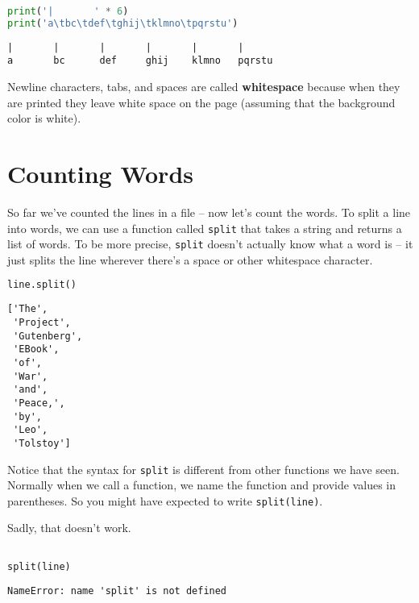 \begin{lstlisting}[language=Python,style=source]
print('|       ' * 6)
print('a\tbc\tdef\tghij\tklmno\tpqrstu')
\end{lstlisting}

\begin{lstlisting}[style=output]
|       |       |       |       |       |
a       bc      def     ghij    klmno   pqrstu
\end{lstlisting}

Newline characters, tabs, and spaces are called \textbf{whitespace}
because when they are printed they leave white space on the page
(assuming that the background color is white).

\section{Counting Words}\label{counting-words}

So far we've counted the lines in a file -- now let's count the words.
To split a line into words, we can use a function called
\passthrough{\lstinline!split!} that takes a string and returns a list
of words. To be more precise, \passthrough{\lstinline!split!} doesn't
actually know what a word is -- it just splits the line wherever there's
a space or other whitespace character.

\begin{lstlisting}[language=Python,style=source]
line.split()
\end{lstlisting}

\begin{lstlisting}[style=output]
['The',
 'Project',
 'Gutenberg',
 'EBook',
 'of',
 'War',
 'and',
 'Peace,',
 'by',
 'Leo',
 'Tolstoy']
\end{lstlisting}

Notice that the syntax for \passthrough{\lstinline!split!} is different
from other functions we have seen. Normally when we call a function, we
name the function and provide values in parentheses. So you might have
expected to write \passthrough{\lstinline!split(line)!}.

\pagebreak

Sadly, that doesn't work.

\begin{lstlisting}[language=Python,style=source]
%%expect NameError

split(line)
\end{lstlisting}

\begin{lstlisting}[style=output]
NameError: name 'split' is not defined
\end{lstlisting}

